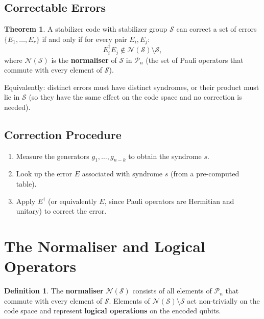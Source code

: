 \documentclass[11pt]{article}
\theoremstyle{definition}
\newtheorem{definition}{Definition}[section]
\newtheorem{theorem}{Theorem}[section]
\begin{document}
\subsection{Correctable Errors}

\begin{theorem}
A stabilizer code with stabilizer group $\mathcal{S}$ can correct a set of errors $\{E_1,\dots,E_r\}$ if and only if for every pair $E_i,E_j$:
\[
    E_i^\dagger E_j \notin \mathcal{N}(\mathcal{S})\setminus\mathcal{S},
\]
where $\mathcal{N}(\mathcal{S})$ is the \textbf{normaliser} of $\mathcal{S}$ in $\mathcal{P}_n$ (the set of Pauli operators that commute with every element of $\mathcal{S}$).
\end{theorem}

Equivalently: distinct errors must have distinct syndromes, or their product must lie in $\mathcal{S}$ (so they have the same effect on the code space and no correction is needed).

\subsection{Correction Procedure}

\begin{enumerate}
    \item Measure the generators $g_1,\dots,g_{n-k}$ to obtain the syndrome $s$.
    \item Look up the error $E$ associated with syndrome $s$ (from a pre-computed table).
    \item Apply $E^\dagger$ (or equivalently $E$, since Pauli operators are Hermitian and unitary) to correct the error.
\end{enumerate}

\section{The Normaliser and Logical Operators}

\begin{definition}
The \textbf{normaliser} $\mathcal{N}(\mathcal{S})$ consists of all elements of $\mathcal{P}_n$ that commute with every element of $\mathcal{S}$.  Elements of $\mathcal{N}(\mathcal{S})\setminus\mathcal{S}$ act non-trivially on the code space and represent \textbf{logical operations} on the encoded qubits.
\end{definition}
\end{document}
